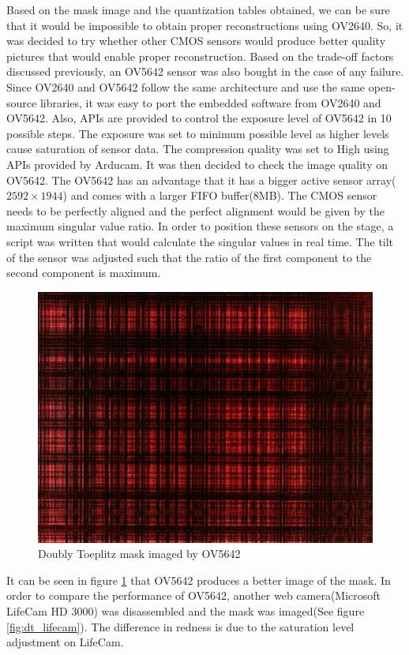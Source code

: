Based on the mask image and the quantization tables obtained, we can be sure that it would be impossible to obtain proper reconstructions using OV2640. So, it was decided to try whether other CMOS sensors would produce better quality pictures that would enable proper reconstruction. Based on the trade-off factors discussed previously, an OV5642 sensor was also bought in the case of any failure. Since OV2640 and OV5642 follow the same architecture and use the same open-source libraries, it was easy to port the embedded software from OV2640 and OV5642. Also, APIs are provided to control the exposure level of OV5642 in 10 possible steps. The exposure was set to minimum possible level as higher levels cause saturation of sensor data. The compression quality was set to High using APIs provided by Arducam. It was then decided to check the image quality on OV5642. The OV5642 has an advantage that it has a bigger active sensor array($2592 \times 1944$) and comes with a larger FIFO buffer(8MB). The CMOS sensor needs to be perfectly aligned and the perfect alignment would be given by the maximum singular value ratio. In order to position these sensors on the stage, a script was written that would calculate the singular values in real time. The tilt of the sensor was adjusted such that the ratio of the first component to the second component is maximum. 
\begin{figure}[h]
\centering
\includegraphics[scale=0.125]{pics/slm/ov5642dtmask.jpg}
\caption{Doubly Toeplitz mask imaged by OV5642}
\label{fig:dt_ov5642}
\end{figure}
It can be seen in figure \ref{fig:dt_ov5642} that OV5642 produces a better image of the mask. In order to compare the performance of OV5642, another web camera(Microsoft LifeCam HD 3000) was disassembled and the mask was imaged(See figure \ref{fig:dt_lifecam}). The difference in redness is due to the saturation level adjustment on LifeCam.
